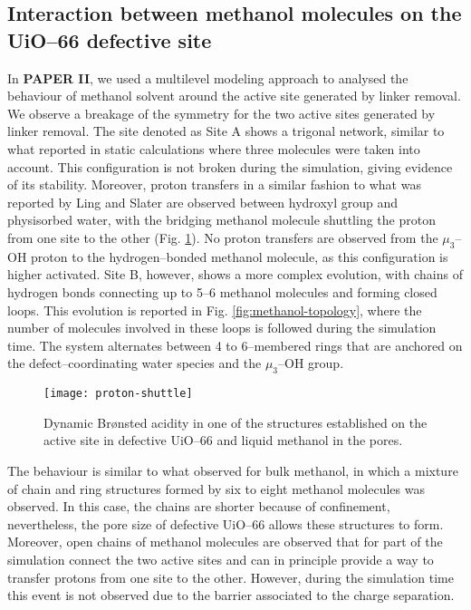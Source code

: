 \subsection*{Interaction between methanol molecules on the UiO--66 defective site}
In \textbf{PAPER II}, we used a multilevel modeling approach to analysed the behaviour of methanol solvent around the active site generated by linker removal. We observe a breakage of the symmetry for the two active sites generated by linker removal. The site denoted as Site A shows a trigonal network, similar to what reported in static calculations where three molecules were taken into account. This configuration is not broken during the simulation, giving evidence of its stability. Moreover, proton transfers in a similar fashion to what was reported by Ling and Slater \cite{ling2016dynamic} are observed between hydroxyl group and physisorbed water, with the bridging methanol molecule shuttling the proton from one site to the other (Fig. \ref{fig:proton-shuttle}). No proton transfers are observed from the $\mu_3$--OH proton to the hydrogen--bonded methanol molecule, as this configuration is higher activated. Site B, however, shows a more complex evolution, with chains of hydrogen bonds connecting up to 5--6 methanol molecules and forming closed loops. This evolution is reported in Fig. \ref{fig:methanol-topology}, where the number of molecules involved in these loops is followed during the simulation time. The system alternates between 4 to 6--membered rings that are anchored on the defect--coordinating water species and the $\mu_3$--OH group. 
\begin{figure}[!htbp]
	\centering
	\texttt{[image: proton-shuttle]}
	\caption{Dynamic Br\o{}nsted acidity in one of the structures established on the active site in defective UiO--66 and liquid methanol in the pores.}
	\label{fig:proton-shuttle}
\end{figure}
\npar
The behaviour is similar to what observed for bulk methanol\cite{kashtanov2005chemical, pagliai2003hydrogen, morrone2002ab}, in which a mixture of chain and ring structures formed by six to eight methanol molecules was observed. In this case, the chains are shorter because of confinement, nevertheless, the pore size of defective UiO--66 allows these structures to form. Moreover, open chains of methanol molecules are observed that for part of the simulation connect the two active sites and can in principle provide a way to transfer protons from one site to the other. However, during the simulation time this event is not observed due to the barrier associated to the charge separation. 
